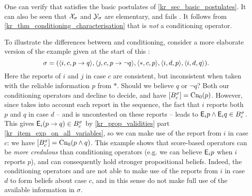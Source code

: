 One can verify that \scorebasedop{} satisfies the basic postulates of
\cref{kr_sec_basic_postulates}. It can also be seen that $\mathcal{X}_\sigma$ and
$\mathcal{Y}_\sigma$ are elementary, and \scorebasedop{} fails \incvac{}.
%
%
It follows from
\cref{kr_thm_conditioning_characterisation} that \scorebasedop{} is \emph{not} a
conditioning operator.\footnotemark{}


\begin{example}
\label{kr_ex_score_based}
     To illustrate the differences between \scorebasedop{} and conditioning,
     consider a more elaborate version of the
     example given at the start of this :
     \[
        \sigma = (
            \langle {i, c, p \rightarrow q} \rangle,
            \langle {j, c, p \rightarrow\neg q} \rangle,
            \langle {\ast, c, p} \rangle,
            \langle {i, d, p} \rangle,
            \langle {i, d, q} \rangle
        ).
     \]
     Here the reports of $i$ and $j$ in case $c$ are consistent,
     but inconsistent when taken with
     the reliable information $p$ from $\ast$. Should we believe $q$ or $\neg
     q$? Both our conditioning operators \varbasedcond{} and \partbasedcond{}
     decline to decide, and have $\left[{B^\sigma_c}\right] = \operatorname{Cn}_0(p)$. However,
     since \scorebasedop{} takes into account each report in the
     sequence, the fact that $i$ reports both $p$ and $q$ in case $d$ -- and is
     uncontested on these reports -- leads to
     $\mathsf{E}_i{p} \land \mathsf{E}_i{q} \in B^\sigma_c$. This gives $\mathsf{E}_i(p \rightarrow q)
     \in B^\sigma_c$ by \cref{kr_prop_validities} part
     \cref{kr_item_exp_on_all_variables}, so we can make use of the report
     from $i$ in case $c$: we have $\left[{B^\sigma_c}\right] = \operatorname{Cn}_0(p \land
     q)$.
     This example shows that score-based operators can be \emph{more credulous}
     than conditioning operators (e.g. we can believe $\mathsf{E}_i{p}$ when
     $i$ reports $p$), and can consequently hold stronger propositional
     beliefs. Indeed, the conditioning operators \varbasedcond{} and
     \partbasedcond{} are not able to make use of the reports from $i$ in case
     $d$ to form beliefs about case $c$, and in this sense do not make full use
     of the available information in $\sigma$.

\end{example}

